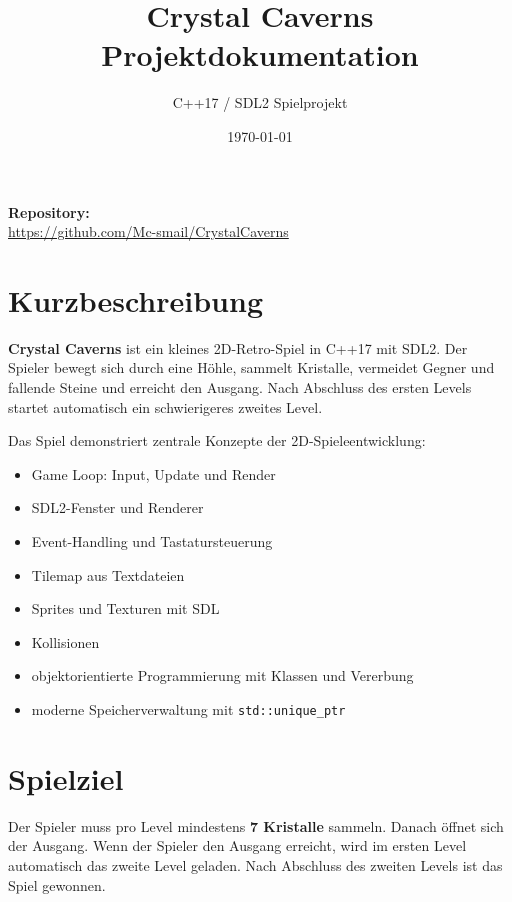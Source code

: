 \documentclass[12pt,a4paper]{article}
\title{\textbf{Crystal Caverns}\\\large Projektdokumentation}
\author{C++17 / SDL2 Spielprojekt}
\date{\today}
\begin{document}
\maketitle
\thispagestyle{empty}

\begin{center}
\vspace{1cm}
\textbf{Repository:} \\ \url{https://github.com/Mc-smail/CrystalCaverns}
\end{center}

\newpage
\tableofcontents
\newpage

\section{Kurzbeschreibung}

\textbf{Crystal Caverns} ist ein kleines 2D-Retro-Spiel in C++17 mit SDL2. Der Spieler bewegt sich durch eine Höhle, sammelt Kristalle, vermeidet Gegner und fallende Steine und erreicht den Ausgang. Nach Abschluss des ersten Levels startet automatisch ein schwierigeres zweites Level.

Das Spiel demonstriert zentrale Konzepte der 2D-Spieleentwicklung:

\begin{itemize}
    \item Game Loop: Input, Update und Render
    \item SDL2-Fenster und Renderer
    \item Event-Handling und Tastatursteuerung
    \item Tilemap aus Textdateien
    \item Sprites und Texturen mit SDL
    \item Kollisionen
    \item objektorientierte Programmierung mit Klassen und Vererbung
    \item moderne Speicherverwaltung mit \texttt{std::unique\_ptr}
\end{itemize}

\section{Spielziel}

Der Spieler muss pro Level mindestens \textbf{7 Kristalle} sammeln. Danach öffnet sich der Ausgang. Wenn der Spieler den Ausgang erreicht, wird im ersten Level automatisch das zweite Level geladen. Nach Abschluss des zweiten Levels ist das Spiel gewonnen.
\end{document}
